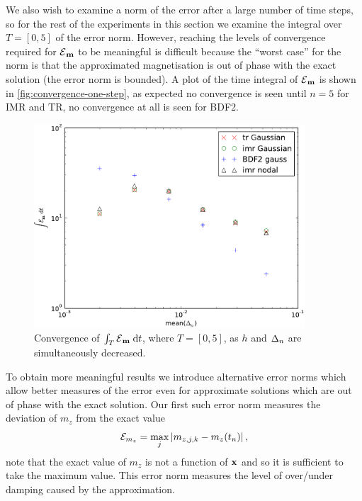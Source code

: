 We also wish to examine a norm of the error after a large number of time steps, so for the rest of the experiments in this section we examine the integral over $T = [0, 5]$ of the error norm.
However, reaching the levels of convergence required for $\mathcal{E}{}_{\boldsymbol{\mathrm{m}}}$ to be meaningful is difficult because the ``worst case'' for the norm is that the approximated magnetisation is out of phase with the exact solution (\ie the error norm is bounded).
A plot of the time integral of $\mathcal{E}{}_{\boldsymbol{\mathrm{m}}}$ is shown in \cref{fig:convergence-one-step}, as expected no convergence is seen until $n=5$ for IMR and TR, no convergence at all is seen for BDF2.
\begin{figure}
  \centering
  \includegraphics[width=0.9\textwidth]{plots/2d_wave_solution_convergence_long_time/errornormintegralvsmeanofdts.pdf}
  \caption{Convergence of ${\int_T {\mathcal{E}{}_{\boldsymbol{\mathrm{m}}}} {\; \mathrm{{d}}} t}$, where $T=[0,5]$, as $h$ and $\Delta_{n}$ are simultaneously decreased.}
  \label{fig:convergence-long-time-full-norm}
\end{figure}

To obtain more meaningful results we introduce alternative error norms which allow better measures of the error even for approximate solutions which are out of phase with the exact solution.
Our first such error norm measures the deviation of $m_z$ from the exact value
\begin{equation}
  \mathcal{E}_{m_z} = \max_j \left|{m_{z,j,k} - m_z(t_n)} \right|,
\end{equation}
note that the exact value of $m_z$ is not a function of $\boldsymbol{\mathrm{x}}$ and so it is sufficient to take the maximum value.
This error norm measures the level of over/under damping caused by the approximation.

